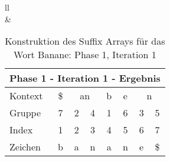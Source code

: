 \begin{table}[H]
\begin{adjustbox}{max width=\textwidth}
\begin{tabular}{ll}
\\
&
\\

\begin{tabular}{lccccccc}
\multicolumn{8}{l}{Phase 1 - Iteration 1 - Ergebnis}                                                                                                                                                          \\ \hline
\multicolumn{1}{l|}{Kontext} & \multicolumn{1}{c|}{\$} & \multicolumn{2}{c|}{\cellcolor[HTML]{\yellow}an}                            & \multicolumn{1}{c|}{b} & \multicolumn{1}{c|}{e} & \multicolumn{2}{c}{n} \\
\multicolumn{1}{l|}{Gruppe}  & \multicolumn{1}{c|}{7}  & \cellcolor[HTML]{\yellow}2 & \multicolumn{1}{c|}{\cellcolor[HTML]{\yellow}4} & \multicolumn{1}{c|}{1} & \multicolumn{1}{c|}{6} & 3         & 5         \\ \hline
\multicolumn{1}{l|}{Index}   & 1                       & 2                         & 3                                              & 4                      & 5                      & 6         & 7         \\
\multicolumn{1}{l|}{Zeichen} & b                       & a                         & n                                              & a                      & n                      & e         & \$       
\end{tabular}

\end{tabular}
\end{adjustbox}

\caption[Konstruktion des Suffix Arrays für das Wort Banane: Phase 1, Iteration 1]{Konstruktion des Suffix Arrays für das Wort Banane: Phase 1, Iteration 1}
\label{fig_banane_1_1} 
\end{table}
